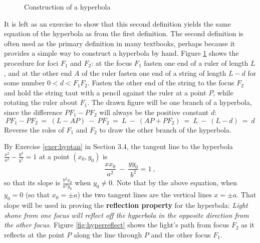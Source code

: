 \begin{figure}[h]
\begin{minipage}[b]{7cm}
\begin{center}
\vspace{-4mm}
 \end{center}
 \caption[]{\enskip Construction of a hyperbola}
 \label{fig:drawhyper}
\end{minipage}
\end{figure}\vspace{-2mm}

It is left as an exercise to show that this second definition yields the same
equation of the hyperbola as from the first definition. The second definition
is often used as the primary definition in many textbooks, perhaps because it
provides a simple way to construct a hyperbola by hand. Figure
\ref{fig:drawhyper} shows the procedure for foci $F_1$ and $F_2$: at the focus
$F_1$ fasten one end of a ruler of length $L$, and at the other end $A$ of the
ruler fasten one end of a string of length $L-d$ for some number $0<d<F_1F_2$.
Fasten the other end of the string to the focus $F_2$ and hold the string taut
with a pencil against the ruler at a point $P$, while rotating the ruler about
$F_1$. The drawn figure will be one branch of a hyperbola, since the difference
$PF_1 - PF_2$ will always be the positive constant
$d$:
\[
PF_1 - PF_2 ~=~ (L - AP) ~-~ PF_2 ~=~ L ~-~ (AP + PF_2) ~=~ L ~-~ (L - d) ~=~ d
\]
Reverse the roles of $F_1$ and $F_2$ to draw the other branch of the hyperbola.

By Exercise \ref{exer:hyptan} in Section 3.4, the tangent
line to the hyperbola $\frac{x^2}{a^2} - \frac{y^2}{b^2} = 1$ at a point
$(x_0,y_0)$ is
\begin{equation}\label{eqn:hypertan}
\frac{x x_0}{a^2} ~-~ \frac{y y_0}{b^2} = 1 ~,
\end{equation}
so that its slope is $\frac{b^2x_0}{a^2y_0}$ when $y_0 \ne 0$. Note that by the
above equation, when $y_0=0$ (so that $x_0=\pm a$) the two tangent lines are the
vertical lines $x=\pm a$.
\newpage
That slope will
be used in proving the \textbf{reflection property} for the hyperbola:
\emph{Light shone from one focus will reflect off the hyperbola in the opposite
direction from the other focus.} Figure \ref{fig:hyperreflect} shows the light's
path from focus $F_2$ as it reflects at the point $P$ along the line through
$P$ and the other focus
$F_1$.

